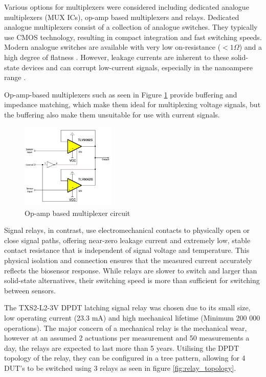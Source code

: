 Various options for multiplexers were considered including dedicated analogue multiplexers (MUX ICs), op-amp based multiplexers and relays. Dedicated analogue multiplexers consist of a collection of analogue switches. They typically use CMOS technology, resulting in compact integration and fast switching speeds. Modern analogue switches are available with very low on-resistance ($<1\Omega$) and a high degree of flatness \cite{SelectingRightCMOS}. However, leakage currents are inherent to these solid-state devices and can corrupt low-current signals, especially in the nanoampere range \cite{SelectingRightCMOS}. 

Op-amp-based multiplexers such as seen in Figure \ref{fig:opamp_mux} provide buffering and impedance matching, which make them ideal for multiplexing voltage signals, but the buffering also make them unsuitable for use with current signals.

\begin{figure}[H]
    \centering
    \includegraphics[width=0.4\textwidth]{OpAmpMux.png}
    \caption{Op-amp based multiplexer circuit \cite{Sboa311a}}
    \label{fig:opamp_mux}
\end{figure}

Signal relays, in contrast, use electromechanical contacts to physically open or close signal paths, offering near-zero leakage current and extremely low, stable contact resistance that is independent of signal voltage and temperature. This physical isolation and connection ensures that the measured current accurately reflects the biosensor response. While relays are slower to switch and larger than solid-state alternatives, their switching speed is more than sufficient for switching between sensors.

The TXS2-L2-3V DPDT latching signal relay was chosen due to its small size, low operating current (23.3 mA) and high mechanical lifetime (Minimum 200 000 operations). The major concern of a mechanical relay is the mechanical wear, however at an assumed 2 actuations per measurement and 50 measurements a day, the relays are expected to last more than 5 years. Utilising the DPDT topology of the relay, they can be configured in a tree pattern, allowing for 4 DUT's to be switched using 3 relays as seen in figure \ref{fig:relay_topology}. 

